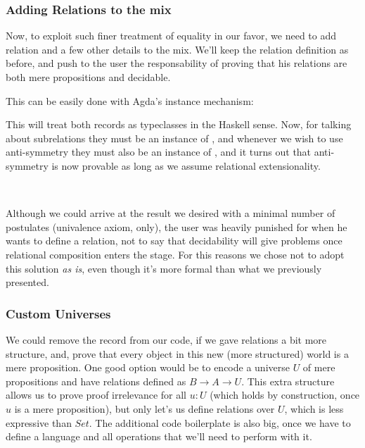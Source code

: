   \subsubsection{Adding Relations to the mix}
  
  Now, to exploit such finer treatment of equality in our favor, we need to add
  relation and a few other details to the mix. We'll keep the relation definition
  as before, and push to the user the responsability of proving that his relations
  are both mere propositions and decidable.
  
  This can be easily done with Agda's instance mechanism:
  
  
  This will treat both records as typeclasses in the Haskell sense. Now, for talking about
  subrelations they must be an instance of , and whenever we wish to use anti-symmetry
  they must also be an instance of , and it turns out that anti-symmetry is now
  provable as long as we assume relational extensionality.
  
  \\
  
  Although we could arrive at the result we desired with a minimal number of postulates (univalence axiom, only), 
  the user was heavily punished for when he wants to define a relation, not to
  say that decidability will give problems once relational composition enters the stage. For this reasons
  we chose not to adopt this solution \emph{as is}, even though it's more formal than what we previously
  presented.

\subsubsection{Custom Universes}


  We could remove the  record from our code, if we gave relations a bit more structure,
  and, prove that every object in this new (more structured) world is a mere proposition.
  One good option would be to encode a universe $U$ of mere propositions and have relations
  defined as $B \rightarrow A \rightarrow U$. This extra structure allows us to prove proof irrelevance
  for all $u : U$ (which holds by construction, once $u$ is a mere proposition), but only let's us define
  relations over $U$, which is less expressive than $Set$. The additional code boilerplate is also big,
  once we have to define a language and all operations that we'll need to perform with it.
  
